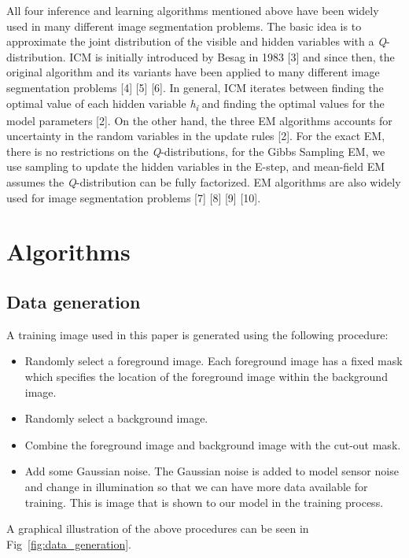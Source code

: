 \documentclass{article} %
\begin{document}
All four inference and learning algorithms mentioned above have been widely used in many different image segmentation problems. The basic idea is to approximate the joint distribution of the visible and hidden variables with a \textit{Q}-distribution. ICM is initially introduced by Besag in 1983 [3] and since then, the original algorithm and its variants have been applied to many different image segmentation problems [4] [5] [6]. In general, ICM iterates between finding the optimal value of each hidden variable \textit{h}\textsubscript{\textit{i}} and finding the optimal values for the model parameters [2]. On the other hand, the three EM algorithms accounts for uncertainty in the random variables in the update rules [2]. For the exact EM, there is no restrictions on the \textit{Q}-distributions, for the Gibbs Sampling EM, we use sampling to update the hidden variables in the E-step, and mean-field EM assumes the \textit{Q}-distribution can be fully factorized. EM algorithms are also widely used for image segmentation problems [7] [8] [9] [10].

\section{Algorithms}
\label{alog}
\subsection{Data generation}
\label{data_gen}
A training image used in this paper is generated using the following procedure:
\begin{itemize}

\item Randomly select a foreground image. Each foreground image has a fixed mask which specifies the location of the foreground image within the background image.

\item Randomly select a background image.

\item Combine the foreground image and background image with the cut-out mask.

\item Add some Gaussian noise. The Gaussian noise is added to model sensor noise and change in illumination so that we can have more data available for training. This is image that is shown to our model in the training process.
\end{itemize}

A graphical illustration of the above procedures can be seen in Fig~\ref{fig:data_generation}.
\end{document}
